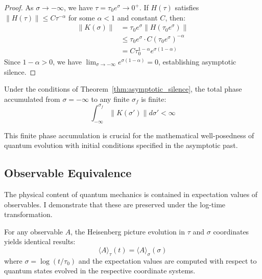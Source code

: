 \begin{proof}
As $\sigma \to -\infty$, we have $\tau = \tau_0 e^\sigma \to 0^+$. If $H(\tau)$ satisfies $\|H(\tau)\| \leq C \tau^{-\alpha}$ for some $\alpha < 1$ and constant $C$, then:
\begin{align}
\|K(\sigma)\| &= \tau_0 e^\sigma \|H(\tau_0 e^\sigma)\| \\
&\leq \tau_0 e^\sigma \cdot C (\tau_0 e^\sigma)^{-\alpha} \\
&= C \tau_0^{1-\alpha} e^{\sigma(1-\alpha)}
\end{align}
Since $1-\alpha > 0$, we have $\lim_{\sigma \to -\infty} e^{\sigma(1-\alpha)} = 0$, establishing asymptotic silence.
\end{proof}

\begin{corollary}
Under the conditions of Theorem~\ref{thm:asymptotic_silence}, the total phase accumulated from $\sigma = -\infty$ to any finite $\sigma_f$ is finite:
\begin{equation}
\int_{-\infty}^{\sigma_f} \|K(\sigma')\| d\sigma' < \infty
\end{equation}
\end{corollary}

This finite phase accumulation is crucial for the mathematical well-posedness of quantum evolution with initial conditions specified in the asymptotic past.

\subsection{Observable Equivalence}
\label{subsec:observable_equivalence}

The physical content of quantum mechanics is contained in expectation values of observables. I demonstrate that these are preserved under the log-time transformation.

\begin{theorem}
\label{thm:heisenberg_equivalence}
For any observable $A$, the Heisenberg picture evolution in $\tau$ and $\sigma$ coordinates yields identical results:
\begin{equation}
\langle A \rangle_\tau(t) = \langle A \rangle_\sigma(\sigma)
\end{equation}
where $\sigma = \log(t/\tau_0)$ and the expectation values are computed with respect to quantum states evolved in the respective coordinate systems.
\end{theorem}


